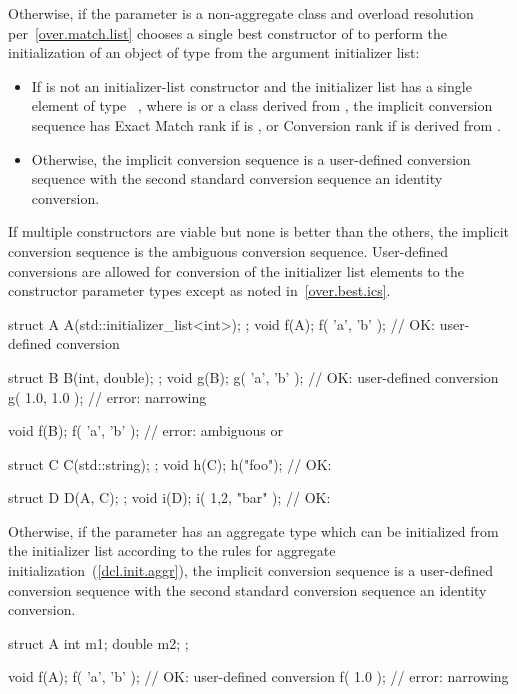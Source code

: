 \pnum
Otherwise, if the parameter is a non-aggregate class  and overload
resolution per~\ref{over.match.list} chooses a single best constructor  of
 to perform the initialization of an object of type  from the
argument initializer list:
\begin{itemize}
\item
If  is not an initializer-list constructor
and the initializer list has a single element of type \cv{}~,
where  is  or a class derived from ,
the implicit conversion sequence has Exact Match rank if  is ,
or Conversion rank if  is derived from .
\item
Otherwise, the implicit conversion sequence is a user-defined
conversion sequence with the second standard conversion sequence an
identity conversion.
\end{itemize}
If multiple constructors are viable but none is better than
the others, the implicit conversion sequence is the ambiguous conversion
sequence. User-defined conversions are allowed for conversion of the initializer
list elements to the constructor parameter types except as noted
in~\ref{over.best.ics}.
\begin{example}
\begin{codeblock}
struct A {
  A(std::initializer_list<int>);
};
void f(A);
f( {'a', 'b'} );        // OK:  user-defined conversion

struct B {
  B(int, double);
};
void g(B);
g( {'a', 'b'} );        // OK:  user-defined conversion
g( {1.0, 1.0} );        // error: narrowing

void f(B);
f( {'a', 'b'} );        // error: ambiguous  or 

struct C {
  C(std::string);
};
void h(C);
h({"foo"});             // OK: 

struct D {
  D(A, C);
};
void i(D);
i({ {1,2}, {"bar"} });  // OK: 
\end{codeblock}
\end{example}

\pnum
Otherwise, if the parameter has an aggregate type which can be initialized from
the initializer list according to the rules for aggregate
initialization~(\ref{dcl.init.aggr}), the implicit conversion sequence is a
user-defined conversion sequence with the second standard conversion
sequence an identity conversion. \begin{example}
\begin{codeblock}
struct A {
  int m1;
  double m2;
};

void f(A);
f( {'a', 'b'} );        // OK:  user-defined conversion
f( {1.0} );             // error: narrowing
\end{codeblock}
\end{example}

